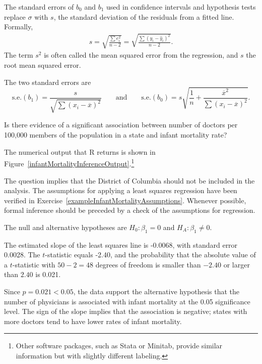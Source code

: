 The standard errors of $b_0$ and $b_1$ used in confidence intervals and hypothesis tests replace $\sigma$ with $s$, the standard deviation of the residuals from a fitted line. Formally, 
\begin{align}
 s = \sqrt{\frac{\sum e^{2}_{i}}{n-2}} =  \sqrt{\frac{\sum (y_{i}-\hat{y}_{i})^{2}}{n-2}}.
  \label{equation:regressionMSE}
\end{align}
The term $s^2$ is often called the mean squared error from the regression, and $s$ the root mean squared error. 

The two standard errors are
\[\text{s.e.}(b_1) = \frac{s}{\sqrt{\sum(x_i -\overline{x})^2}}  \qquad \text{and} \qquad \text{s.e.}(b_0) = s \sqrt{\frac{1}{n} + \frac{\overline{x}^2}
	{\sum(x_i - \overline{x})^2}}. \]

\textD{\newpage}

\begin{examplewrap}
\begin{nexample}{Is there evidence of a significant association between number of doctors per 100,000 members of the population in a state and infant mortality rate? 
		
The numerical output that \textsf{R} returns is shown in Figure~\ref{infantMortalityInferenceOutput}.\footnote{Other software packages, such as Stata or Minitab, provide similar information but with slightly different labeling.}}\label{exampleInfantMortalityInference}%
The question implies that the District of Columbia should not be included in the analysis. The assumptions for applying a least squares regression have been verified in Exercise~\ref{exampleInfantMortalityAssumptions}. Whenever possible, formal inference should be preceded by a check of the assumptions for regression.

The null and alternative hypotheses are $H_0:\beta_1 = 0$ and $H_A:\beta_1 \neq 0.$	


The estimated slope of the least squares line is -0.0068, with standard error 0.0028. The $t$-statistic equals -2.40, and the probability that the absolute value of a $t$-statistic with $50-2=48$ degrees of freedom is smaller than $-2.40$ or larger than $2.40$ is 0.021. 

Since $p = 0.021 < 0.05$, the data support the alternative hypothesis that the number of physicians is associated with infant mortality at the 0.05 significance level. The sign of the slope implies that the association is negative; states with more doctors tend to have lower rates of infant mortality.
\end{nexample}
\end{examplewrap}

